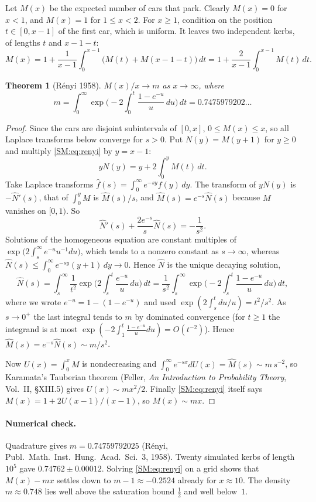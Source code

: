\documentclass[11pt,openany]{book}
\theoremstyle{plain}
\newtheorem{theorem}{Theorem}[chapter]
\theoremstyle{definition}
\theoremstyle{remark}
\begin{document}
Let $M(x)$ be the expected number of cars that park. Clearly $M(x)=0$ for $x<1$, and $M(x)=1$ for
$1\le x<2$. For $x\ge1$, condition on the position $t\in[0,x-1]$ of the first car, which is uniform. It
leaves two independent kerbs, of lengths $t$ and $x-1-t$:
\begin{equation}\label{SM:eq:renyi}
  M(x)=1+\frac1{x-1}\int_0^{x-1}\big(M(t)+M(x-1-t)\big)\,dt=1+\frac2{x-1}\int_0^{x-1}M(t)\,dt .
\end{equation}

\begin{theorem}[R\'enyi 1958]\label{SM:thm:renyi}
$M(x)/x\to m$ as $x\to\infty$, where
\[
  m=\int_0^\infty\exp\Big(-2\int_0^t\frac{1-e^{-u}}{u}\,du\Big)\,dt=0.7475979202\ldots
\]
\end{theorem}

\begin{proof}
Since the cars are disjoint subintervals of $[0,x]$, $0\le M(x)\le x$, so all Laplace transforms below
converge for $s>0$. Put $N(y)=M(y+1)$ for $y\ge0$ and multiply \eqref{SM:eq:renyi} by $y=x-1$:
\[
  yN(y)=y+2\int_0^yM(t)\,dt .
\]
Take Laplace transforms $\hat f(s)=\int_0^\infty e^{-sy}f(y)\,dy$. The transform of $yN(y)$ is
$-\hat N'(s)$, that of $\int_0^yM$ is $\hat M(s)/s$, and $\hat M(s)=e^{-s}\hat N(s)$ because $M$ vanishes on
$[0,1)$. So
\[
  \hat N'(s)+\frac{2e^{-s}}{s}\hat N(s)=-\frac1{s^2}.
\]
Solutions of the homogeneous equation are constant multiples of $\exp\big(2\int_s^\infty e^{-u}u^{-1}du\big)$,
which tends to a nonzero constant as $s\to\infty$, whereas $\hat N(s)\le\int_0^\infty e^{-sy}(y+1)\,dy\to0$. Hence
$\hat N$ is the unique decaying solution,
\[
  \hat N(s)=\int_s^\infty\frac{1}{t^2}\exp\Big(2\int_s^t\frac{e^{-u}}u\,du\Big)\,dt
  =\frac1{s^2}\int_s^\infty\exp\Big(-2\int_s^t\frac{1-e^{-u}}u\,du\Big)\,dt,
\]
where we wrote $e^{-u}=1-(1-e^{-u})$ and used $\exp(2\int_s^t du/u)=t^2/s^2$. As $s\to0^+$ the last
integral tends to $m$ by dominated convergence (for $t\ge1$ the integrand is at most
$\exp(-2\int_1^t\frac{1-e^{-u}}u du)=O(t^{-2})$). Hence $\hat M(s)=e^{-s}\hat N(s)\sim m/s^2$.

Now $U(x)=\int_0^xM$ is nondecreasing and $\int_0^\infty e^{-sx}dU(x)=\hat M(s)\sim m\,s^{-2}$, so Karamata's
Tauberian theorem (Feller, \emph{An Introduction to Probability Theory}, Vol.~II, \S XIII.5) gives
$U(x)\sim mx^2/2$. Finally \eqref{SM:eq:renyi} itself says $M(x)=1+2U(x-1)/(x-1)$, so $M(x)\sim mx$.
\end{proof}

\paragraph{Numerical check.} Quadrature gives $m=0.74759792025$ (R\'enyi, Publ.\ Math.\ Inst.\ Hung.\
Acad.\ Sci.\ 3, 1958). Twenty simulated kerbs of length $10^5$ gave
$0.74762\pm0.00012$. Solving \eqref{SM:eq:renyi} on a grid shows that $M(x)-mx$ settles down to
$m-1\approx-0.2524$ already for $x\approx10$. The density $m\approx0.748$ lies well above the saturation
bound $\frac12$ and well below~$1$.
\end{document}
